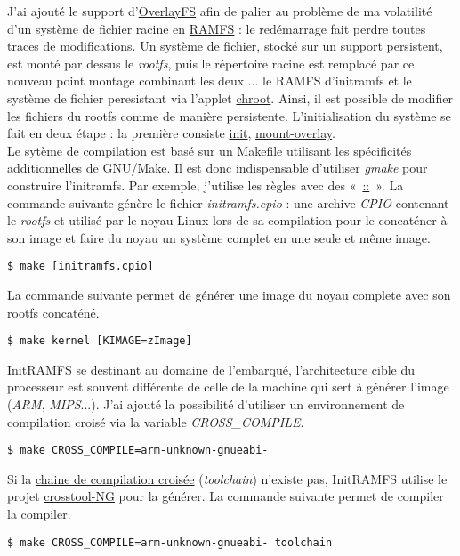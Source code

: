 \documentclass[a4paper]{article}
\begin{document}
J'ai ajouté le support d'\href{https://www.kernel.org/doc/Documentation/filesystems/overlayfs.txt}{OverlayFS} afin de palier au problème de ma volatilité d'un système de fichier racine en \href{https://fr.wikipedia.org/wiki/Ramfs}{RAMFS} : le redémarrage fait perdre toutes traces de modifications. Un système de fichier, stocké sur un support persistent, est monté par dessus le \textit{rootfs}, puis le répertoire racine est remplacé par ce nouveau point montage combinant les deux ... le RAMFS d'initramfs et le système de fichier peresistant via l'applet \href{http://www.busybox.net/downloads/BusyBox.html##chroot}{chroot}. Ainsi, il est possible de modifier les fichiers du rootfs comme de manière persistente. L'initialisation du système se fait en deux étape : la première consiste
\href{https://github.com/gazoo74/initramfs/blob/master/packages-initramfs/overlay/init}{init}, \href{https://github.com/gazoo74/initramfs/blob/master/packages-initramfs/overlay/etc/init.d/mount-overlay}{mount-overlay}.\\

Le sytème de compilation est basé sur un Makefile utilisant les spécificités additionnelles de GNU/Make. Il est donc indispensable d'utiliser \textit{gmake} pour construire l'initramfs. Par exemple, j'utilise les règles avec des «~\href{https://www.gnu.org/software/make/manual/html_node/Double_002dColon.html}{::}~».
La commande suivante génère le fichier \textit{initramfs.cpio} : une archive \textit{CPIO} contenant le \textit{rootfs} et utilisé par le noyau Linux lors de sa compilation pour le concaténer à son image et faire du noyau un système complet en une seule et même image.
\begin{verbatim}
$ make [initramfs.cpio]
\end{verbatim}
La commande suivante permet de générer une image du noyau complete avec son rootfs concaténé.
\begin{verbatim}
$ make kernel [KIMAGE=zImage]
\end{verbatim}

InitRAMFS se destinant au domaine de l'embarqué, l'architecture cible du processeur est souvent différente de celle de la machine qui sert à générer l'image (\textit{ARM}, \textit{MIPS}...). J'ai ajouté la possibilité d'utiliser un environnement de compilation croisé via la variable \textit{CROSS\_COMPILE}.
\begin{verbatim}
$ make CROSS_COMPILE=arm-unknown-gnueabi-
\end{verbatim}

Si la \href{https://fr.wikipedia.org/wiki/Cha\%C3\%AEne_de_compilation}{chaine de compilation croisée} (\textit{toolchain}) n'existe pas, InitRAMFS utilise le projet \href{http://crosstool-ng.org/}{crosstool-NG} pour la générer. La commande suivante permet de compiler la compiler.
\begin{verbatim}
$ make CROSS_COMPILE=arm-unknown-gnueabi- toolchain
\end{verbatim}
\end{document}
